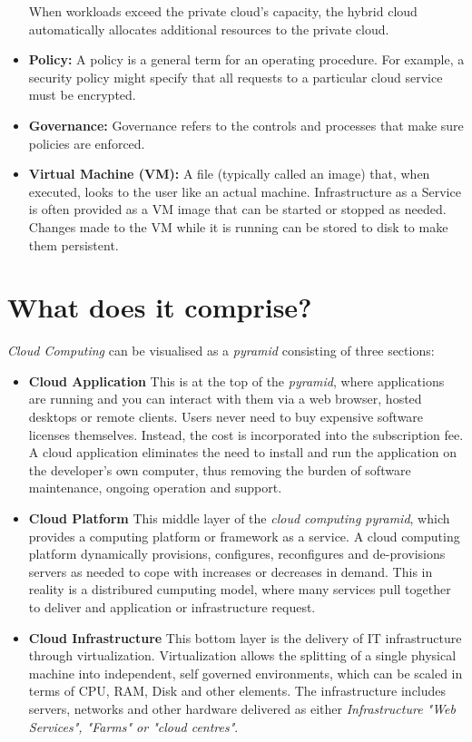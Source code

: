 \begin{itemize}
        When workloads exceed the private cloud’s capacity, the hybrid cloud automatically allocates additional resources to the 
        private cloud.
  \item {\bf Policy:} A policy is a general term for an operating procedure. For example, a security policy might specify that all 
        requests to a particular cloud service must be encrypted.
  \item {\bf Governance:} Governance refers to the controls and processes that make sure policies are enforced.       
  \item {\bf Virtual Machine (VM):} A file (typically called an image) that, when executed, looks to the user like an actual machine. 
        Infrastructure as a Service is often provided as a VM image that can be started or stopped as needed. Changes made to the 
        VM while it is running can be stored to disk to make them persistent.        
\end{itemize}
\section{What does it comprise?}
\emph{Cloud Computing} can be visualised as a \emph{pyramid} consisting of three sections:
\begin{itemize}
  \item {\bf Cloud Application} This is at the top of the \emph{pyramid}, where applications are running and you can interact with
        them via a web browser, hosted desktops or remote clients. Users never need to buy expensive software licenses themselves.
        Instead, the cost is incorporated into the subscription fee. A cloud application eliminates the need to install and run
        the application on the developer's own computer, thus removing the burden of software maintenance, ongoing operation and 
        support.
  \item {\bf Cloud Platform} This middle layer of the \emph{cloud computing pyramid}, which provides a computing platform or
        framework as a service. A cloud computing platform dynamically provisions, configures, reconfigures and de-provisions servers
        as needed to cope with increases or decreases in demand. This in reality is a distribured cumputing model, where many 
        services pull together to deliver and application or infrastructure request.
  \item {\bf Cloud Infrastructure} This bottom layer is the delivery of IT infrastructure through virtualization. Virtualization
        allows the splitting of a single physical machine into independent, self governed environments, which can be scaled in
        terms of CPU, RAM, Disk and other elements. The infrastructure includes servers, networks and other hardware delivered as either
        \emph{Infrastructure "Web Services", "Farms" or "cloud centres"}.
\end{itemize}
